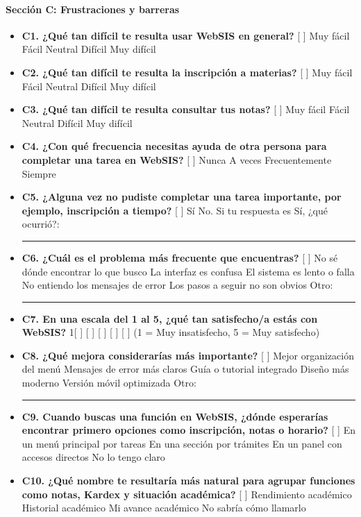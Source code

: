 \paragraph{Sección C: Frustraciones y barreras}
\begin{itemize}
  \item \textbf{C1. ¿Qué tan difícil te resulta usar WebSIS en general?} [ ] Muy fácil \quad [ ] Fácil \quad [ ] Neutral \quad [ ] Difícil \quad [ ] Muy difícil
  \item \textbf{C2. ¿Qué tan difícil te resulta la inscripción a materias?} [ ] Muy fácil \quad [ ] Fácil \quad [ ] Neutral \quad [ ] Difícil \quad [ ] Muy difícil
  \item \textbf{C3. ¿Qué tan difícil te resulta consultar tus notas?} [ ] Muy fácil \quad [ ] Fácil \quad [ ] Neutral \quad [ ] Difícil \quad [ ] Muy difícil
  \item \textbf{C4. ¿Con qué frecuencia necesitas ayuda de otra persona para completar una tarea en WebSIS?} [ ] Nunca \quad [ ] A veces \quad [ ] Frecuentemente \quad [ ] Siempre
  \item \textbf{C5. ¿Alguna vez no pudiste completar una tarea importante, por ejemplo, inscripción a tiempo?} [ ] Sí \quad [ ] No. Si tu respuesta es Sí, ¿qué ocurrió?: \rule{4cm}{0.4pt}
  \item \textbf{C6. ¿Cuál es el problema más frecuente que encuentras?} [ ] No sé dónde encontrar lo que busco \quad [ ] La interfaz es confusa \quad [ ] El sistema es lento o falla \quad [ ] No entiendo los mensajes de error \quad [ ] Los pasos a seguir no son obvios \quad [ ] Otro: \rule{2cm}{0.4pt}
  \item \textbf{C7. En una escala del 1 al 5, ¿qué tan satisfecho/a estás con WebSIS?} 1[ ] [ ] [ ] [ ] [ ] \quad (1 = Muy insatisfecho, 5 = Muy satisfecho)
  \item \textbf{C8. ¿Qué mejora considerarías más importante?} [ ] Mejor organización del menú \quad [ ] Mensajes de error más claros \quad [ ] Guía o tutorial integrado \quad [ ] Diseño más moderno \quad [ ] Versión móvil optimizada \quad [ ] Otro: \rule{2cm}{0.4pt}
  \item \textbf{C9. Cuando buscas una función en WebSIS, ¿dónde esperarías encontrar primero opciones como inscripción, notas o horario?} [ ] En un menú principal por tareas \quad [ ] En una sección por trámites \quad [ ] En un panel con accesos directos \quad [ ] No lo tengo claro
  \item \textbf{C10. ¿Qué nombre te resultaría más natural para agrupar funciones como notas, Kardex y situación académica?} [ ] Rendimiento académico \quad [ ] Historial académico \quad [ ] Mi avance académico \quad [ ] No sabría cómo llamarlo

\end{itemize}
